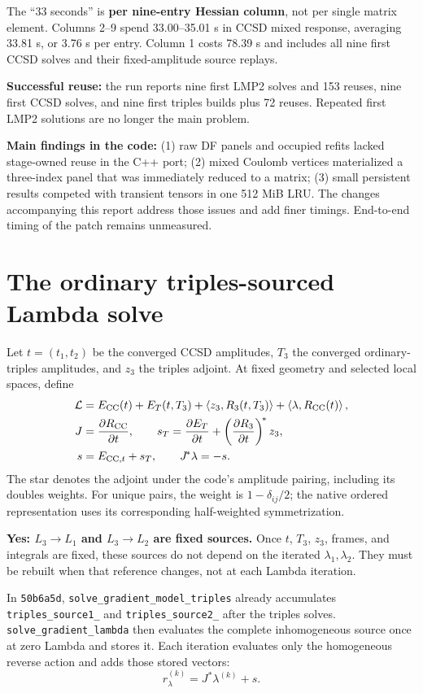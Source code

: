 \documentclass[10pt,letterpaper]{article}
\newcommand{\ip}[2]{\left\langle #1,#2\right\rangle}
\newcommand{\sectionpage}[1]{\newpage\section{#1}}
\begin{document}
The ``33 seconds'' is \textbf{per nine-entry Hessian column}, not per single matrix element. Columns 2--9 spend 33.00--35.01 s in CCSD mixed response, averaging 33.81 s, or 3.76 s per entry. Column 1 costs 78.39 s and includes all nine first CCSD solves and their fixed-amplitude source replays.

\textbf{Successful reuse:} the run reports nine first LMP2 solves and 153 reuses, nine first CCSD solves, and nine first triples builds plus 72 reuses. Repeated first LMP2 solutions are no longer the main problem.

\textbf{Main findings in the code:} (1) raw DF panels and occupied refits lacked stage-owned reuse in the C++ port; (2) mixed Coulomb vertices materialized a three-index panel that was immediately reduced to a matrix; (3) small persistent results competed with transient tensors in one 512 MiB LRU. The changes accompanying this report address those issues and add finer timings. End-to-end timing of the patch remains unmeasured.

\sectionpage{The ordinary triples-sourced Lambda solve}
Let $t=(t_1,t_2)$ be the converged CCSD amplitudes, $T_3$ the converged ordinary-triples amplitudes, and $z_3$ the triples adjoint. At fixed geometry and selected local spaces, define
\begin{align}
\mathcal L &= E_{\rm CC}(t)+E_T(t,T_3)+\ip{z_3}{R_3(t,T_3)}+\ip{\lambda}{R_{\rm CC}(t)},\\
J&=\frac{\partial R_{\rm CC}}{\partial t},\qquad
s_T=\frac{\partial E_T}{\partial t}+
 \left(\frac{\partial R_3}{\partial t}\right)^{\!*}z_3,\\
s&=E_{{\rm CC},t}+s_T,\qquad J^{\!*}\lambda=-s.
\end{align}
The star denotes the adjoint under the code's amplitude pairing, including its doubles weights. For unique pairs, the weight is $1-\delta_{ij}/2$; the native ordered representation uses its corresponding half-weighted symmetrization.

\textbf{Yes: $L_3\!\to L_1$ and $L_3\!\to L_2$ are fixed sources.} Once $t$, $T_3$, $z_3$, frames, and integrals are fixed, these sources do not depend on the iterated $\lambda_1,\lambda_2$. They must be rebuilt when that reference changes, not at each Lambda iteration.

In \texttt{50b6a5d}, \texttt{solve\_gradient\_model\_triples} already accumulates \texttt{triples\_source1\_} and \texttt{triples\_source2\_} after the triples solves. \texttt{solve\_gradient\_lambda} then evaluates the complete inhomogeneous source once at zero Lambda and stores it. Each iteration evaluates only the homogeneous reverse action and adds those stored vectors:
\begin{equation}
r_\lambda^{(k)}=J^{\!*}\lambda^{(k)}+s.
\end{equation}
\end{document}
